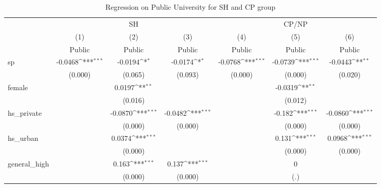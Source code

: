 \documentclass[]{AEA}
\def\sym#1{\ifmmode^{#1}\else\(^{#1}\)\fi}
\begin{document}
    \begin{center}
    \begin{table}
    \caption{Regression on Public University for SH and CP group}
    \setlength{\tabcolsep}{0.5mm}
    \begin{tabular}{l*{6}c}
    \toprule
    &\multicolumn{3}{c}{SH} &\multicolumn{3}{c}{CP/NP} \\
    \cmidrule(l){2-4}\cmidrule(l){5-7}
    &\multicolumn{1}{c}{(1)}&\multicolumn{1}{c}{(2)}&\multicolumn{1}{c}{(3)}&\multicolumn{1}{c}{(4)}&\multicolumn{1}{c}{(5)}&\multicolumn{1}{c}{(6)} \\
    &\multicolumn{1}{c}{Public}&\multicolumn{1}{c}{Public}&\multicolumn{1}{c}{Public}&\multicolumn{1}{c}{Public}&\multicolumn{1}{c}{Public}&\multicolumn{1}{c}{Public} \\
    \midrule
    sp          &     -0.0468\sym{***}&     -0.0194\sym{*}  &     -0.0174\sym{*}  &     -0.0768\sym{***}&     -0.0739\sym{***}&     -0.0443\sym{**} \\
        &     (0.000)         &     (0.065)         &     (0.093)         &     (0.000)         &     (0.000)         &     (0.020)         \\
    [1em]
    female      &                     &      0.0197\sym{**} &                     &                     &     -0.0319\sym{**} &                     \\
        &                     &     (0.016)         &                     &                     &     (0.012)         &                     \\
    [1em]
    hs\_private  &                     &     -0.0870\sym{***}&     -0.0482\sym{***}&                     &      -0.182\sym{***}&     -0.0860\sym{***}\\
        &                     &     (0.000)         &     (0.000)         &                     &     (0.000)         &     (0.000)         \\
    [1em]
    hs\_urban    &                     &      0.0374\sym{***}&                     &                     &       0.131\sym{***}&      0.0968\sym{***}\\
        &                     &     (0.000)         &                     &                     &     (0.000)         &     (0.000)         \\
    [1em]
    general\_high&                     &       0.163\sym{***}&       0.137\sym{***}&                     &           0         &                     \\
        &                     &     (0.000)         &     (0.000)         &                     &         (.)         &                     \\

\end{tabular}
\end{table}
\end{center}
\end{document}
